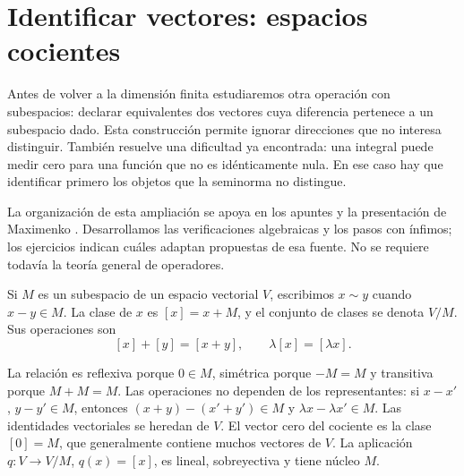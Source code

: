 \section{Identificar vectores: espacios cocientes}\label{ampl:cocientes}
Antes de volver a la dimensión finita estudiaremos otra operación con subespacios: declarar equivalentes dos vectores cuya diferencia pertenece a un subespacio dado. Esta construcción permite ignorar direcciones que no interesa distinguir. También resuelve una dificultad ya encontrada: una integral puede medir cero para una función que no es idénticamente nula. En ese caso hay que identificar primero los objetos que la seminorma no distingue.

La organización de esta ampliación se apoya en los apuntes y la presentación de Maximenko \cite{max-cociente,max-seminormado}. Desarrollamos las verificaciones algebraicas y los pasos con ínfimos; los ejercicios indican cuáles adaptan propuestas de esa fuente. No se requiere todavía la teoría general de operadores.

\begin{definicion}
Si $M$ es un subespacio de un espacio vectorial $V$, escribimos $x\sim y$ cuando $x-y\in M$. La clase de $x$ es $[x]=x+M$, y el conjunto de clases se denota $V/M$. Sus operaciones son
\[
 [x]+[y]=[x+y],\qquad \lambda[x]=[\lambda x].
\]
\end{definicion}
La relación es reflexiva porque $0\in M$, simétrica porque $-M=M$ y transitiva porque $M+M=M$. Las operaciones no dependen de los representantes: si $x-x'$, $y-y'\in M$, entonces $(x+y)-(x'+y')\in M$ y $\lambda x-\lambda x'\in M$. Las identidades vectoriales se heredan de $V$. El vector cero del cociente es la clase $[0]=M$, que generalmente contiene muchos vectores de $V$. La aplicación $q:V\to V/M$, $q(x)=[x]$, es lineal, sobreyectiva y tiene núcleo $M$.

